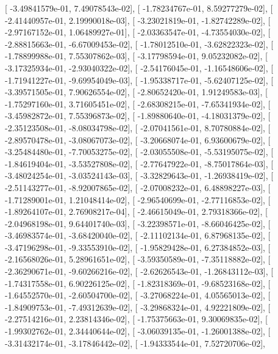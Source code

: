 \documentclass{article}
\begin{document}
       [ -3.49841579e-01,   7.49078543e-02],
       [ -1.78234767e-01,   8.59277279e-02],
       [ -2.41440957e-01,   2.19990018e-03],
       [ -3.23021819e-01,  -1.82742289e-02],
       [ -2.97167152e-01,   1.06489927e-01],
       [ -2.03363547e-01,  -4.73554030e-02],
       [ -2.88815663e-01,  -6.67009453e-02],
       [ -1.78012510e-01,  -3.62822323e-02],
       [ -1.78899988e-01,   7.55307862e-03],
       [ -3.17798594e-01,   9.05232082e-02],
       [ -3.17325934e-01,  -2.93040322e-02],
       [ -2.54176045e-01,  -1.16548606e-02],
       [ -1.71941227e-01,  -9.69954049e-03],
       [ -1.95338717e-01,  -5.62407125e-02],
       [ -3.39571505e-01,   7.90626554e-02],
       [ -2.80652420e-01,   1.91249583e-03],
       [ -1.75297160e-01,   3.71605451e-02],
       [ -2.68308215e-01,  -7.65341934e-02],
       [ -3.45982872e-01,   7.55396873e-02],
       [ -1.89880640e-01,  -4.18031379e-02],
       [ -2.35123508e-01,  -8.08034798e-02],
       [ -2.07041561e-01,   8.70780884e-02],
       [ -2.89570478e-01,  -3.08067073e-02],
       [ -3.20668074e-01,   6.93600679e-02],
       [ -3.25484480e-01,  -7.70053275e-02],
       [ -2.03055508e-01,  -5.53195075e-02],
       [ -1.84619404e-01,  -3.53527808e-02],
       [ -2.77647922e-01,  -8.75017864e-03],
       [ -3.48024254e-01,  -3.03524143e-03],
       [ -3.32829643e-01,  -1.26938419e-02],
       [ -2.51143277e-01,  -8.92007865e-02],
       [ -2.07008232e-01,   6.48898227e-03],
       [ -1.71289001e-01,   1.21048414e-02],
       [ -2.96540699e-01,  -2.77116853e-02],
       [ -1.89264107e-01,   2.76908217e-04],
       [ -2.46615049e-01,   2.79318366e-02],
       [ -2.04968198e-01,   9.64401740e-03],
       [ -3.22398571e-01,  -8.66046425e-02],
       [ -3.46983574e-01,  -3.68420040e-02],
       [ -2.11102134e-01,   6.87968135e-02],
       [ -3.47196298e-01,  -9.33553910e-02],
       [ -1.95829428e-01,   6.27384852e-03],
       [ -2.16568026e-01,   5.28961651e-02],
       [ -3.59350589e-01,  -7.35118882e-02],
       [ -2.36290671e-01,  -9.60266216e-02],
       [ -2.62626543e-01,  -1.26843112e-03],
       [ -1.74317558e-01,   6.90226125e-02],
       [ -1.82318369e-01,  -9.68523168e-02],
       [ -1.64552570e-01,  -2.60504700e-02],
       [ -3.27068224e-01,   4.05565013e-02],
       [ -1.84909753e-01,  -7.49312639e-02],
       [ -3.29868324e-01,   4.92221809e-02],
       [ -2.27514216e-01,   2.23814346e-02],
       [ -1.75375663e-01,   9.30069835e-02],
       [ -1.99302762e-01,   2.34440644e-02],
       [ -3.06039135e-01,  -1.26001388e-02],
       [ -3.31432174e-01,  -3.17846442e-02],
       [ -1.94333544e-01,   7.52720706e-02],
\end{document}
